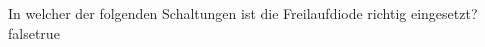     {In welcher der folgenden Schaltungen ist die Freilaufdiode richtig eingesetzt?}
    {}
    {}
    {}
    {}
    {false}{true}
